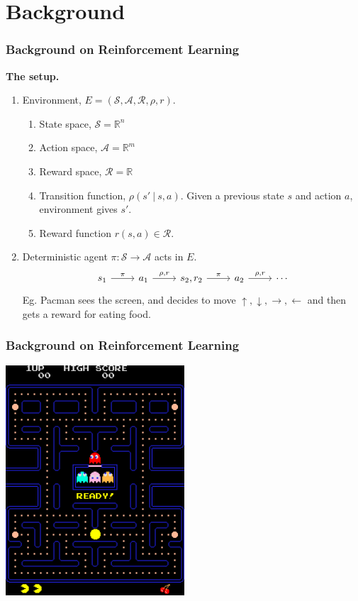 \documentclass{beamer}
\numberwithin{equation}{subsection}
\numberwithin{theorem}{subsection}
\begin{document}
\section{Background}
\begin{frame}[fragile]
  \frametitle{Background on Reinforcement Learning}
  \textbf{The setup.}
  \begin{enumerate}
    \item Environment, $E = (\mathcal{S}, \mathcal{A}, \mathcal{R}, \rho, r)$.
    \begin{enumerate}
    \item State space, $\mathcal{S} = \mathbb{R}^n$
    \item Action space, $\mathcal{A} = \mathbb{R}^m$
    \item Reward space, $\mathcal{R} = \mathbb{R}$
    \item Transition function, $\rho(s'\ |\ s,a)$. Given a previous state $s$ and action $a$, environment gives $s'$.
    \item Reward function $r(s,a) \in \mathcal{R}$.
    \end{enumerate}
    \item Deterministic agent $\pi: \mathcal{S} \to \mathcal{A}$ acts in $E$.
    \begin{equation*}
      \begin{tikzcd}
          s_1 \arrow{r}{\pi} & a_1 \arrow{r}{\rho, r} & s_2, r_2 \arrow{r}{\pi}& a_2  \arrow{r}{\rho, r} & \cdots
         \end{tikzcd}
    \end{equation*}
    Eg. Pacman sees the screen, and decides to move $\uparrow, \downarrow, \rightarrow, \leftarrow$ and then gets a reward for eating food.
  \end{enumerate}
\end{frame}
\begin{frame}
\frametitle{Background on Reinforcement Learning}
  \begin{center}
    \includegraphics[width=0.5\textwidth]{Pac-man.png}
  \end{center}
\end{frame}
\end{document}
